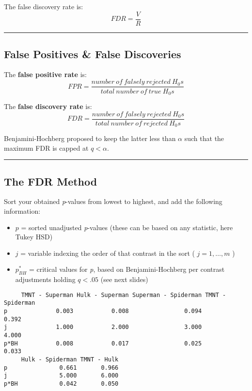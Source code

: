 \documentclass[]{article}
\providecommand{\tightlist}{%
  \setlength{\itemsep}{0pt}\setlength{\parskip}{0pt}}
\begin{document}
The false discovery rate is: \[FDR=\frac{V}{R}\]

\begin{center}\rule{0.5\linewidth}{\linethickness}\end{center}

\hypertarget{false-positives-false-discoveries-1}{%
\subsection{False Positives \& False
Discoveries}\label{false-positives-false-discoveries-1}}

The \textbf{false positive rate} is:
\[FPR=\frac{number\:of\:falsely\:rejected\:H_0s}{total\:number\:of\:true\:H_0s}\]

The \textbf{false discovery rate} is:
\[FDR=\frac{number\:of\:falsely\:rejected\:H_0s}{total\:number\:of\:rejected\:H_0s}\]

Benjamini-Hochberg proposed to keep the latter less than \(\alpha\) such
that the maximum FDR is capped at \(q<\alpha\).

\begin{center}\rule{0.5\linewidth}{\linethickness}\end{center}

\hypertarget{the-fdr-method}{%
\subsection{The FDR Method}\label{the-fdr-method}}

Sort your obtained \emph{p}-values from lowest to highest, and add the
following information:

\begin{itemize}
\tightlist
\item
  \(p\) = sorted unadjusted \emph{p}-values (these can be based on any
  statistic, here Tukey HSD)
\item
  \(j\) = variable indexing the order of that contrast in the sort (
  \(j=1,\dotsc,m\) )
\item
  \(p_{BH}^*\) = critical values for \emph{p}, based on
  Benjamini-Hochberg per contrast adjustments holding \(q<.05\) (see
  next slides)
\end{itemize}

\begin{verbatim}
     TMNT - Superman Hulk - Superman Superman - Spiderman TMNT - Spiderman
p              0.003           0.008                0.094            0.392
j              1.000           2.000                3.000            4.000
p*BH           0.008           0.017                0.025            0.033
     Hulk - Spiderman TMNT - Hulk
p               0.661       0.966
j               5.000       6.000
p*BH            0.042       0.050
\end{verbatim}
\end{document}
